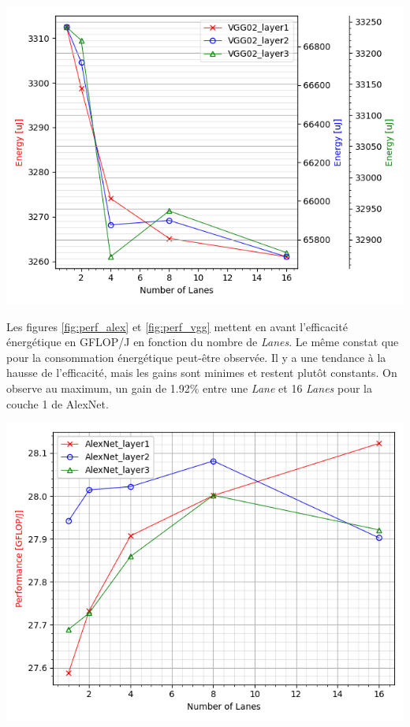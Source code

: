\documentclass[10pt,letterpaper]{article}
\begin{document}
\begin{multicols}{2}
    {\centering
    \includegraphics[width=\linewidth]{VGG_energy.png}
    \captionsetup{hypcap=false}
    \label{fig:energy_vgg}}
    \bigskip

    Les figures \ref{fig:perf_alex} et \ref{fig:perf_vgg} mettent en avant l'efficacité énergétique en GFLOP/J en fonction du 
    nombre de \textit{Lanes}. Le même constat que pour la consommation énergétique peut-être observée. Il y a une tendance à la
    hausse de l'efficacité, mais les gains sont minimes et restent plutôt constants. On observe au maximum, un gain de 1.92\% entre une
    \textit{Lane} et 16 \textit{Lanes} pour la couche 1 de AlexNet.

    {\centering
    \includegraphics[width=\linewidth]{Alex_performance.png}
    \captionsetup{hypcap=false}
    \label{fig:perf_alex}}
    \bigskip


\end{multicols}
\end{document}
